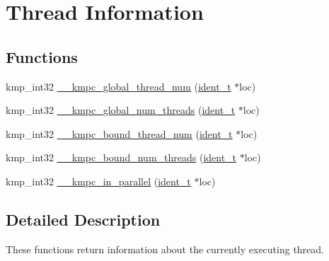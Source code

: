 \hypertarget{group__THREAD__STATES}{\section{Thread Information}
\label{group__THREAD__STATES}
}
\subsection*{Functions}
\begin{DoxyCompactItemize}
\item 
kmp\-\_\-int32 \hyperlink{group__THREAD__STATES_ga39488769ed881a75703495759c0f109f}{\-\_\-\-\_\-kmpc\-\_\-global\-\_\-thread\-\_\-num} (\hyperlink{group__BASIC__TYPES_ga690fda6b92f039a72db263c6b4394ddb}{ident\-\_\-t} $\ast$loc)
\item 
kmp\-\_\-int32 \hyperlink{group__THREAD__STATES_ga127cc7161bbef3ccd2446a9405973192}{\-\_\-\-\_\-kmpc\-\_\-global\-\_\-num\-\_\-threads} (\hyperlink{group__BASIC__TYPES_ga690fda6b92f039a72db263c6b4394ddb}{ident\-\_\-t} $\ast$loc)
\item 
kmp\-\_\-int32 \hyperlink{group__THREAD__STATES_ga9a981e3dcd9264c2cf5bd8a8cc6f16af}{\-\_\-\-\_\-kmpc\-\_\-bound\-\_\-thread\-\_\-num} (\hyperlink{group__BASIC__TYPES_ga690fda6b92f039a72db263c6b4394ddb}{ident\-\_\-t} $\ast$loc)
\item 
kmp\-\_\-int32 \hyperlink{group__THREAD__STATES_gadcc691c6c7695988deba68a2de817a66}{\-\_\-\-\_\-kmpc\-\_\-bound\-\_\-num\-\_\-threads} (\hyperlink{group__BASIC__TYPES_ga690fda6b92f039a72db263c6b4394ddb}{ident\-\_\-t} $\ast$loc)
\item 
kmp\-\_\-int32 \hyperlink{group__THREAD__STATES_ga5c4aad6e2e289283e9c58031f7c4e228}{\-\_\-\-\_\-kmpc\-\_\-in\-\_\-parallel} (\hyperlink{group__BASIC__TYPES_ga690fda6b92f039a72db263c6b4394ddb}{ident\-\_\-t} $\ast$loc)
\end{DoxyCompactItemize}


\subsection{Detailed Description}
These functions return information about the currently executing thread. 

